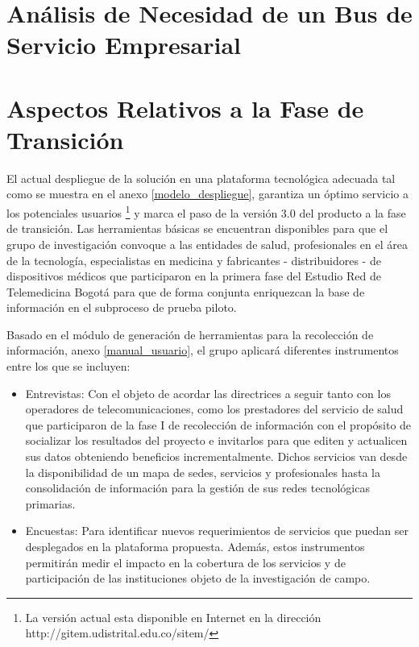 \section{Análisis de Necesidad de un Bus de Servicio Empresarial}
\label{appendix:lista_de_chequeo_ESB}



\section {Aspectos Relativos a la Fase de Transición}

El actual despliegue de la solución en una plataforma tecnológica adecuada tal como se muestra en el anexo \ref{modelo_despliegue}, garantiza un óptimo servicio a los potenciales usuarios \footnote{La versión actual esta disponible en Internet en la dirección http://gitem.udistrital.edu.co/sitem/} y marca el paso de la versión 3.0 del producto a la fase de transición. Las herramientas básicas se encuentran disponibles para que el grupo de investigación convoque a las entidades de salud, profesionales en el área de la tecnología, especialistas en medicina y fabricantes - distribuidores - de dispositivos médicos que participaron en la primera fase del Estudio Red de Telemedicina Bogotá \cite{aparicio2000} para que de forma conjunta enriquezcan la base de información en el subproceso de prueba piloto.

Basado en el módulo de generación de herramientas para la recolección de información, anexo \ref{manual_usuario}, el grupo aplicará diferentes instrumentos entre los que se incluyen:

\begin{itemize}
\item Entrevistas: Con el objeto de acordar las directrices a seguir tanto con los operadores de telecomunicaciones, como los prestadores del servicio de salud que participaron de la fase I de recolección de información con el propósito de socializar los resultados del proyecto e invitarlos para que editen y actualicen sus datos obteniendo beneficios incrementalmente. Dichos servicios van desde la disponibilidad de un mapa de sedes, servicios y profesionales hasta la consolidación de información para la gestión de sus redes tecnológicas primarias.

\item Encuestas: Para identificar nuevos requerimientos de servicios que puedan ser desplegados en la plataforma propuesta. Además, estos instrumentos permitirán medir el impacto en la cobertura de los servicios y de participación de las instituciones objeto de la investigación de campo.
\end{itemize}

